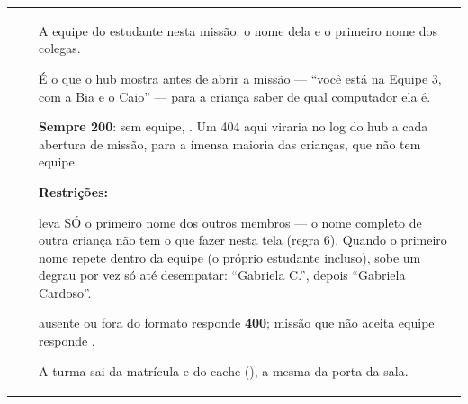 \begin{tabularx}{\linewidth}{@{}L{40mm}L{24mm}X@{}}
\toprule
\headrow {} &  & \\
\midrule
\endhead
{} &  & A equipe do estudante nesta missão: o nome dela e o primeiro nome dos colegas.\par É o que o hub mostra antes de abrir a missão --- \enquote{você está na Equipe 3, com a Bia e o Caio} --- para a criança saber de qual computador ela é.\par \textbf{Sempre 200}: sem equipe, . Um 404 aqui viraria  no log do hub a cada abertura de missão, para a imensa maioria das crianças, que não tem equipe.\par \textbf{Restrições:}\par \hspace*{1em}\textbullet{}  leva SÓ o primeiro nome dos outros membros --- o nome completo de outra criança não tem o que fazer nesta tela (regra 6). Quando o primeiro nome repete dentro da equipe (o próprio estudante incluso), sobe um degrau por vez só até desempatar: \enquote{Gabriela C.}, depois \enquote{Gabriela Cardoso}.\par \hspace*{1em}\textbullet{}  ausente ou fora do formato responde \textbf{400}; missão que não aceita equipe responde .\par \hspace*{1em}\textbullet{} A turma sai da matrícula e do cache (), a mesma da porta da sala.\\

\end{tabularx}
